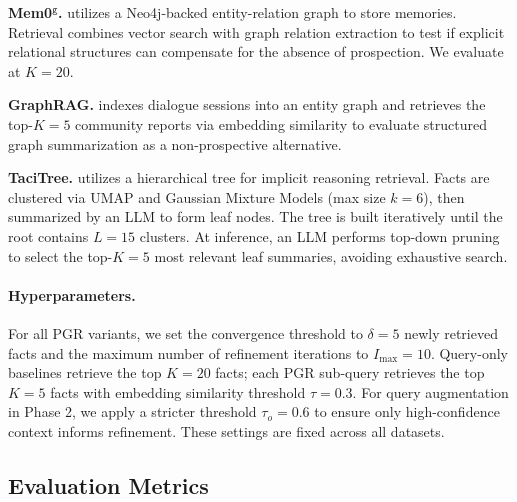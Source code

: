 

\textbf{Mem0$^\texttt{g}$.} \cite{chhikara2025mem0} utilizes a Neo4j-backed entity-relation graph to store memories. Retrieval combines vector search with graph relation extraction to test if explicit relational structures can compensate for the absence of prospection. We evaluate at $K=20$.

\textbf{GraphRAG.} \cite{edge2024graphrag} indexes dialogue sessions into an entity graph and retrieves the top-$K=5$ community reports via embedding similarity to evaluate structured graph summarization as a non-prospective alternative.

\textbf{TaciTree.} \cite{li2025implexconv} utilizes a hierarchical tree for implicit reasoning retrieval. Facts are clustered via UMAP and Gaussian Mixture Models (max size $k=6$), then summarized by an LLM to form leaf nodes. The tree is built iteratively until the root contains $L=15$ clusters. At inference, an LLM performs top-down pruning to select the top-$K=5$ most relevant leaf summaries, avoiding exhaustive search.

\paragraph{Hyperparameters.} For all PGR variants, we set the convergence threshold to $\delta = 5$ newly retrieved facts and the maximum number of refinement iterations to $I_{\max} = 10$. Query-only baselines retrieve the top $K = 20$ facts; each PGR sub-query retrieves the top $K = 5$ facts with embedding similarity threshold $\tau = 0.3$. For query augmentation in Phase 2, we apply a stricter threshold $\tau_o = 0.6$ to ensure only high-confidence context informs refinement. These settings are fixed across all datasets.


\subsection{Evaluation Metrics}

